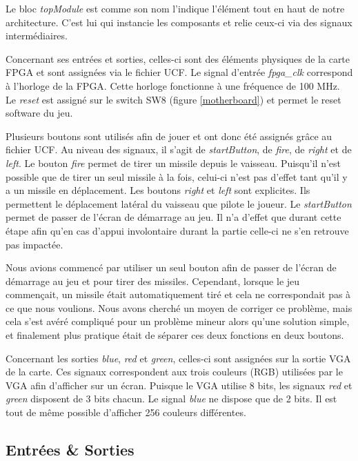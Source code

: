 \documentclass[french]{nakrule}
\begin{document}
Le bloc \emph{topModule} est comme son nom l'indique l'élément tout en haut de notre architecture. C'est lui qui instancie les composants et relie ceux-ci via des signaux intermédiaires. 

Concernant ses entrées et sorties, celles-ci sont des éléments physiques de la carte FPGA et sont assignées via le fichier UCF. Le signal d'entrée \emph{fpga\_clk} correspond à l’horloge de la FPGA. Cette horloge fonctionne à une fréquence de 100 MHz. Le \emph{reset} est assigné sur le switch SW8 (figure \ref{motherboard}) et permet le reset software du jeu.

Plusieurs boutons sont utilisés afin de jouer et ont donc été assignés grâce au fichier UCF. Au niveau des signaux, il s'agit de \emph{startButton}, de \emph{fire}, de \emph{right} et de \emph{left}. 
Le bouton \emph{fire} permet de tirer un missile depuis le vaisseau. Puisqu'il n'est possible que de tirer un seul missile à la fois, celui-ci n'est pas d'effet tant qu'il y a un missile en déplacement. 
Les boutons \emph{right} et \emph{left} sont explicites. Ils permettent le déplacement latéral du vaisseau que pilote le joueur.
Le \emph{startButton} permet de passer de l'écran de démarrage au jeu. Il n'a d'effet que durant cette étape afin qu'en cas d'appui involontaire durant la partie celle-ci ne s'en retrouve pas impactée.

Nous avions commencé par utiliser un seul bouton afin de passer de l'écran de démarrage au jeu et pour tirer des missiles. Cependant, lorsque le jeu commençait, un missile était automatiquement tiré et cela ne correspondait pas à ce que nous voulions. Nous avons cherché un moyen de corriger ce problème, mais cela s'est avéré compliqué pour un problème mineur alors qu'une solution simple, et finalement plus pratique était de séparer ces deux fonctions en deux boutons.

Concernant les sorties \emph{blue}, \emph{red} et \emph{green}, celles-ci sont assignées sur la sortie VGA de la carte. Ces signaux correspondent aux trois couleurs (RGB) utilisées par le VGA afin d'afficher sur un écran. Puisque le VGA utilise 8 bits, les signaux \emph{red} et \emph{green} disposent de 3 bits chacun. Le signal \emph{blue} ne dispose que de 2 bits.
Il est tout de même possible d'afficher 256 couleurs différentes.

\subsection{Entrées \& Sorties}
\label{subsec:Entrees_Sorties_topModule}
\end{document}
